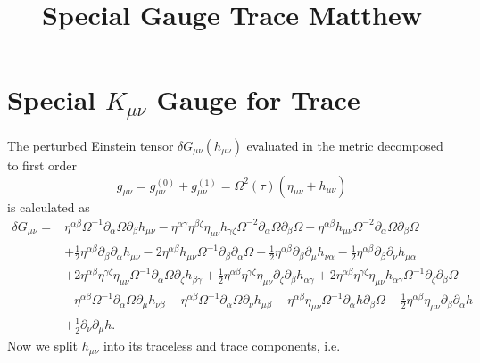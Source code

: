 \documentclass[10pt,letterpaper]{article}
\title{Special Gauge Trace Matthew}
\date{}
\begin{document}
\maketitle
\noindent

\section*{Special $K_{\mu\nu}$ Gauge for Trace}
The perturbed Einstein tensor $\delta  G_{\mu\nu}( h_{\mu\nu})$ evaluated in the metric decomposed to first order 
\begin{equation}
g_{\mu\nu} = g^{(0)}_{\mu\nu} + g^{(1)}_{\mu\nu} = \Omega^2(\tau)(\eta_{\mu\nu}+h_{\mu\nu})
\end{equation}
is calculated as 
\begin{align}
\delta G_{\mu\nu}={}&\eta^{\alpha \beta} \Omega^{-1} \partial_{\alpha}\Omega \partial_{\beta}h_{\mu \nu}
 -  \eta^{\alpha \gamma} \eta^{\beta \zeta} \eta_{\mu \nu} h_{\gamma \zeta} \Omega^{-2} \partial_{\alpha}\Omega \partial_{\beta}\Omega
 + \eta^{\alpha \beta} h_{\mu \nu} \Omega^{-2} \partial_{\alpha}\Omega \partial_{\beta}\Omega\nonumber\\
& + \tfrac{1}{2} \eta^{\alpha \beta} \partial_{\beta}\partial_{\alpha}h_{\mu \nu}
 - 2 \eta^{\alpha \beta} h_{\mu \nu} \Omega^{-1} \partial_{\beta}\partial_{\alpha}\Omega
 -  \tfrac{1}{2} \eta^{\alpha \beta} \partial_{\beta}\partial_{\mu}h_{\nu \alpha}
 -  \tfrac{1}{2} \eta^{\alpha \beta} \partial_{\beta}\partial_{\nu}h_{\mu \alpha}\nonumber\\
& + 2 \eta^{\alpha \beta} \eta^{\gamma \zeta} \eta_{\mu \nu} \Omega^{-1} \partial_{\alpha}\Omega \partial_{\zeta}h_{\beta \gamma}
 + \tfrac{1}{2} \eta^{\alpha \beta} \eta^{\gamma \zeta} \eta_{\mu \nu} \partial_{\zeta}\partial_{\beta}h_{\alpha \gamma}
 + 2 \eta^{\alpha \beta} \eta^{\gamma \zeta} \eta_{\mu \nu} h_{\alpha \gamma} \Omega^{-1} \partial_{\zeta}\partial_{\beta}\Omega\nonumber\\
& -  \eta^{\alpha \beta} \Omega^{-1} \partial_{\alpha}\Omega \partial_{\mu}h_{\nu \beta}
 -  \eta^{\alpha \beta} \Omega^{-1} \partial_{\alpha}\Omega \partial_{\nu}h_{\mu \beta}- \eta^{\alpha \beta} \eta_{\mu \nu} \Omega^{-1} \partial_{\alpha}h \partial_{\beta}\Omega -  \tfrac{1}{2} \eta^{\alpha \beta} \eta_{\mu \nu} \partial_{\beta}\partial_{\alpha}h\nonumber \\
& + \tfrac{1}{2} \partial_{\nu}\partial_{\mu}h.
\end{align}
Now we split $h_{\mu\nu}$ into its traceless and trace components, i.e.
\end{document}
